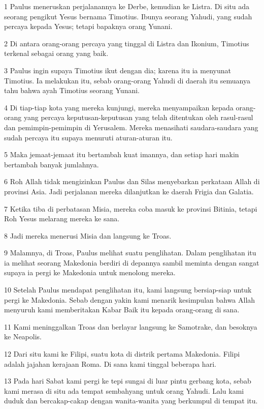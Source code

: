 \par 1 Paulus meneruskan perjalanannya ke Derbe, kemudian ke Listra. Di situ ada seorang pengikut Yesus bernama Timotius. Ibunya seorang Yahudi, yang sudah percaya kepada Yesus; tetapi bapaknya orang Yunani.
\par 2 Di antara orang-orang percaya yang tinggal di Listra dan Ikonium, Timotius terkenal sebagai orang yang baik.
\par 3 Paulus ingin supaya Timotius ikut dengan dia; karena itu ia menyunat Timotius. Ia melakukan itu, sebab orang-orang Yahudi di daerah itu semuanya tahu bahwa ayah Timotius seorang Yunani.
\par 4 Di tiap-tiap kota yang mereka kunjungi, mereka menyampaikan kepada orang-orang yang percaya keputusan-keputusan yang telah ditentukan oleh rasul-rasul dan pemimpin-pemimpin di Yerusalem. Mereka menasihati saudara-saudara yang sudah percaya itu supaya menuruti aturan-aturan itu.
\par 5 Maka jemaat-jemaat itu bertambah kuat imannya, dan setiap hari makin bertambah banyak jumlahnya.
\par 6 Roh Allah tidak mengizinkan Paulus dan Silas menyebarkan perkataan Allah di provinsi Asia. Jadi perjalanan mereka dilanjutkan ke daerah Frigia dan Galatia.
\par 7 Ketika tiba di perbatasan Misia, mereka coba masuk ke provinsi Bitinia, tetapi Roh Yesus melarang mereka ke sana.
\par 8 Jadi mereka menerusi Misia dan langsung ke Troas.
\par 9 Malamnya, di Troas, Paulus melihat suatu penglihatan. Dalam penglihatan itu ia melihat seorang Makedonia berdiri di depannya sambil meminta dengan sangat supaya ia pergi ke Makedonia untuk menolong mereka.
\par 10 Setelah Paulus mendapat penglihatan itu, kami langsung bersiap-siap untuk pergi ke Makedonia. Sebab dengan yakin kami menarik kesimpulan bahwa Allah menyuruh kami memberitakan Kabar Baik itu kepada orang-orang di sana.
\par 11 Kami meninggalkan Troas dan berlayar langsung ke Samotrake, dan besoknya ke Neapolis.
\par 12 Dari situ kami ke Filipi, suatu kota di distrik pertama Makedonia. Filipi adalah jajahan kerajaan Roma. Di sana kami tinggal beberapa hari.
\par 13 Pada hari Sabat kami pergi ke tepi sungai di luar pintu gerbang kota, sebab kami merasa di situ ada tempat sembahyang untuk orang Yahudi. Lalu kami duduk dan bercakap-cakap dengan wanita-wanita yang berkumpul di tempat itu.
